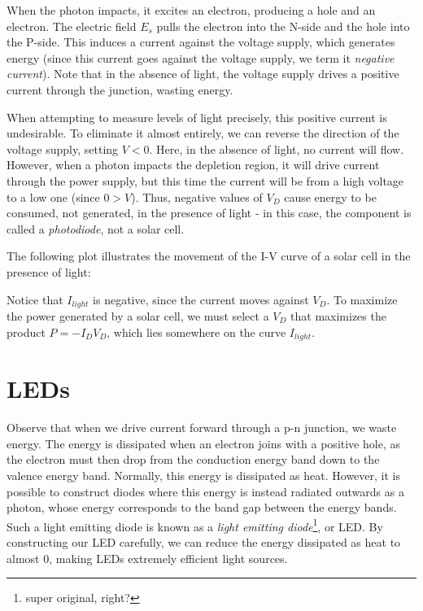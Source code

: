 \documentclass[letterpaper]{article}
\theoremstyle{remark}
\begin{document}
When the photon impacts, it excites an electron, producing a hole and an electron. The electric field $E_s$ pulls the electron into the N-side and the hole into the P-side. This induces a current against the voltage supply, which generates energy (since this current goes against the voltage supply, we term it \emph{negative current}). Note that in the absence of light, the voltage supply drives a positive current through the junction, wasting energy.

When attempting to measure levels of light precisely, this positive current is undesirable. To eliminate it almost entirely, we can reverse the direction of the voltage supply, setting $V < 0$. Here, in the absence of light, no current will flow. However, when a photon impacts the depletion region, it will drive current through the power supply, but this time the current will be from a high voltage to a low one (since $0 > V$). Thus, negative values of $V_D$ cause energy to be consumed, not generated, in the presence of light - in this case, the component is called a \emph{photodiode}, not a solar cell.

The following plot illustrates the movement of the I-V curve of a solar cell in the presence of light:
\begin{center}
\end{center}
Notice that $I_{light}$ is negative, since the current moves against $V_D$. To maximize the power generated by a solar cell, we must select a $V_D$ that maximizes the product $P = -I_DV_D$, which lies somewhere on the curve $I_{light}$.

\section{LEDs}
Observe that when we drive current forward through a p-n junction, we waste energy. The energy is dissipated when an electron joins with a positive hole, as the electron must then drop from the conduction energy band down to the valence energy band. Normally, this energy is dissipated as heat. However, it is possible to construct diodes where this energy is instead radiated outwards as a photon, whose energy corresponds to the band gap between the energy bands. Such a light emitting diode is known as a \emph{light emitting diode}\footnote{super original, right?}, or LED. By constructing our LED carefully, we can reduce the energy dissipated as heat to almost $0$, making LEDs extremely efficient light sources.
\end{document}
